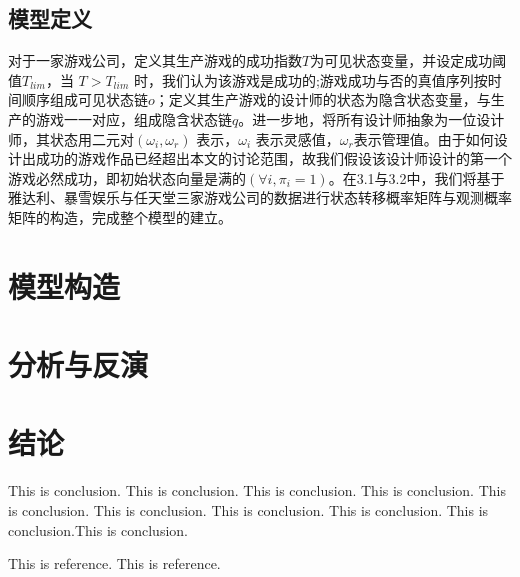 \documentclass[hyperref]{ctexart}
\begin{document}
\begin{multicols}{2}
    \subsection{模型定义}
    对于一家游戏公司，定义其生产游戏的成功指数$T$为可见状态变量，并设定成功阈值$T_{lim}$，当 $T > T_{lim}$ 时，我们认为该游戏是成功的;游戏成功与否的真值序列按时间顺序组成可见状态链$o$；定义其生产游戏的设计师的状态为隐含状态变量，与生产的游戏一一对应，组成隐含状态链$q$。进一步地，将所有设计师抽象为一位设计师，其状态用二元对$(\omega_i, \omega_r)$  表示，$\omega_i$  表示灵感值，$\omega_r$表示管理值。由于如何设计出成功的游戏作品已经超出本文的讨论范围，故我们假设该设计师设计的第一个游戏必然成功，即初始状态向量是满的$(\forall i, \pi_i = 1)$。在3.1与3.2中，我们将基于雅达利、暴雪娱乐与任天堂三家游戏公司的数据进行状态转移概率矩阵与观测概率矩阵的构造，完成整个模型的建立。
    
    
	\section{模型构造}
	\section{分析与反演}
	\section{结论}
	This is conclusion. This is conclusion. This is conclusion. This is conclusion. This is conclusion. This is conclusion. This is conclusion. This is conclusion. This is conclusion.This is conclusion.
	
	\begin{thebibliography}{100}%
		This is reference.%
		This is reference.%
	\end{thebibliography}
	\end{multicols}
\end{document}
